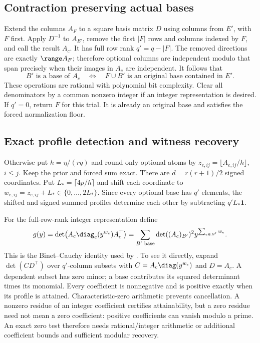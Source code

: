 \subsection{Contraction preserving actual bases}
Extend the columns $A_F$ to a square basis matrix $D$ using columns from
$E'$, with $F$ first. Apply $D^{-1}$ to $A_{E'}$, remove the first $|F|$
rows and columns indexed by $F$, and call the result $A_c$. It has full
row rank $q'=q-|F|$. The removed directions are exactly $\range A_F$;
therefore optional columns are independent modulo that span precisely when
their images in $A_c$ are independent. It follows that
\begin{equation}
 B'\text{ is a base of }A_c
 \quad\Longleftrightarrow\quad
 F\cup B'\text{ is an original base contained in }E'.
 \label{eq:matroid-contraction}
\end{equation}
These operations are rational with polynomial bit complexity. Clear
all denominators by a common nonzero integer if an integer representation
is desired. If $q'=0$, return $F$ for this trial. It is already an original
base and satisfies the forced normalization floor.

\subsection{Exact profile detection and witness recovery}
Otherwise put $h=\eta/(rq)$ and round only optional atoms by
$z_{e,ij}=\lfloor A_{e,ij}/h\rfloor$, $i\le j$. Keep the prior and forced
sum exact. There are $d=r(r+1)/2$ signed coordinates. Put
$L_* =\lceil4p/h\rceil$ and shift each coordinate to
$w_{e,ij}=z_{e,ij}+L_*\in\{0,\ldots,2L_*\}$.
Since every optional base has $q'$ elements, the shifted and signed summed
profiles determine each other by subtracting $q'L_*\mathbf1$.

For the full-row-rank integer representation define
\begin{equation}
 g(y)=\det\!\left(A_c\diag_e(y^{w_e})A_c^\top\right)
 =\sum_{B'\text{ base}}\det((A_c)_{B'})^2
                       y^{\sum_{e\in B'}w_e}.
 \label{eq:matroid-profile-polynomial}
\end{equation}
This is the Binet--Cauchy identity used by
\citet[Lemmas 4.3--4.4]{Berstein2008}. To see it directly, expand
$\det(CD^\top)$ over $q'$-column subsets with
$C=A_c\diag(y^{w_e})$ and $D=A_c$. A dependent subset has zero
minor; a base contributes its squared determinant times its monomial.
Every coefficient is nonnegative and is positive exactly when its profile
is attained. Characteristic-zero arithmetic prevents cancellation. A nonzero residue of an integer coefficient certifies attainability, but a
zero residue need not mean a zero coefficient: positive coefficients can
vanish modulo a prime. An exact zero test therefore needs rational/integer
arithmetic or additional coefficient bounds and sufficient modular recovery.

